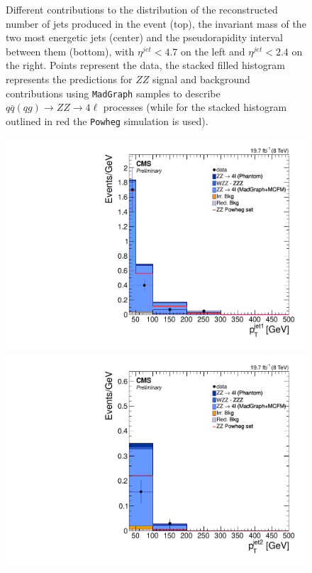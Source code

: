 \begin{figure}[hbtp]
\begin{center}
    \caption{Different contributions to the distribution of the reconstructed number of jets produced in the event (top), the invariant mass of the two most energetic jets (center) and the pseudorapidity interval between them (bottom), with $\eta^{jet} < 4.7$ on the left and $\eta^{jet} < 2.4$ on the right. Points represent the data, the stacked filled histogram represents the predictions for $ZZ$ signal and background contributions using \texttt{MadGraph} samples to describe $q\bar{q}(qg)\to ZZ\to 4\ell$ processes (while for the stacked histogram outlined in red the \texttt{Powheg} simulation is used).}
    \label{fig:sig_recoJJ}
  \end{center}
\end{figure}

\begin{figure}[hbtp]
  \begin{center} 
    \includegraphics[width=\cmsFigWidth]{Figures/PtJet1_mad}
    \includegraphics[width=\cmsFigWidth]{Figures/PtJet2_mad} 

\end{center}
\end{figure}
